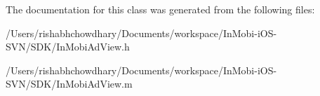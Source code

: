 The documentation for this class was generated from the following files:\begin{DoxyCompactItemize}
\item 
/Users/rishabhchowdhary/Documents/workspace/InMobi-\/iOS-\/SVN/SDK/InMobiAdView.h\item 
/Users/rishabhchowdhary/Documents/workspace/InMobi-\/iOS-\/SVN/SDK/InMobiAdView.m\end{DoxyCompactItemize}
